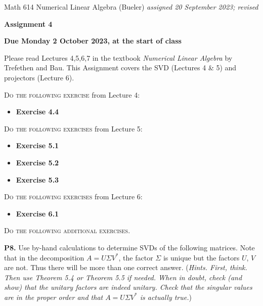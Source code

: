 \documentclass[12pt]{amsart}
\newcommand{\prob}[1]{\bigskip\noindent\textbf{#1.}\quad }
\begin{document}
\scriptsize \noindent Math 614 Numerical Linear Algebra (Bueler) \hfill \emph{assigned 20 September 2023; revised}
\normalsize\medskip

\Large\centerline{\textbf{Assignment 4}}
\large
\medskip

\centerline{\textbf{Due Monday 2 October 2023, at the start of class}}
\medskip
\normalsize

\thispagestyle{empty}

\bigskip
\noindent Please read Lectures 4,5,6,7 in the textbook \emph{Numerical Linear Algebra} by Trefethen and Bau.  This Assignment covers the SVD (Lectures 4 \& 5) and projectors (Lecture 6).

\bigskip
\noindent \textsc{Do the following exercise} from Lecture 4:

\begin{itemize}
\item \textbf{Exercise 4.4}
\end{itemize}

\bigskip
\noindent \textsc{Do the following exercises} from Lecture 5:

\begin{itemize}
\item \textbf{Exercise 5.1}
\item \textbf{Exercise 5.2}
\item \textbf{Exercise 5.3}
\end{itemize}

\bigskip
\noindent \textsc{Do the following exercises} from Lecture 6:

\begin{itemize}
\item \textbf{Exercise 6.1}
\end{itemize}


\bigskip
\noindent \textsc{Do the following additional exercises.}

\prob{P8}  Use by-hand calculations to determine SVDs of the following matrices.  Note that in the decomposition $A = U \Sigma V^*$, the factor $\Sigma$ is unique but the factors $U$, $V$ are not.  Thus there will be more than one correct answer.  (\emph{Hints.  First, think.  Then use Theorem 5.4 or Theorem 5.5 if needed.  When in doubt, check (and show) that the unitary factors are indeed unitary.  Check that the singular values are in the proper order and that $A = U \Sigma V^*$ is actually true.})
\end{document}
